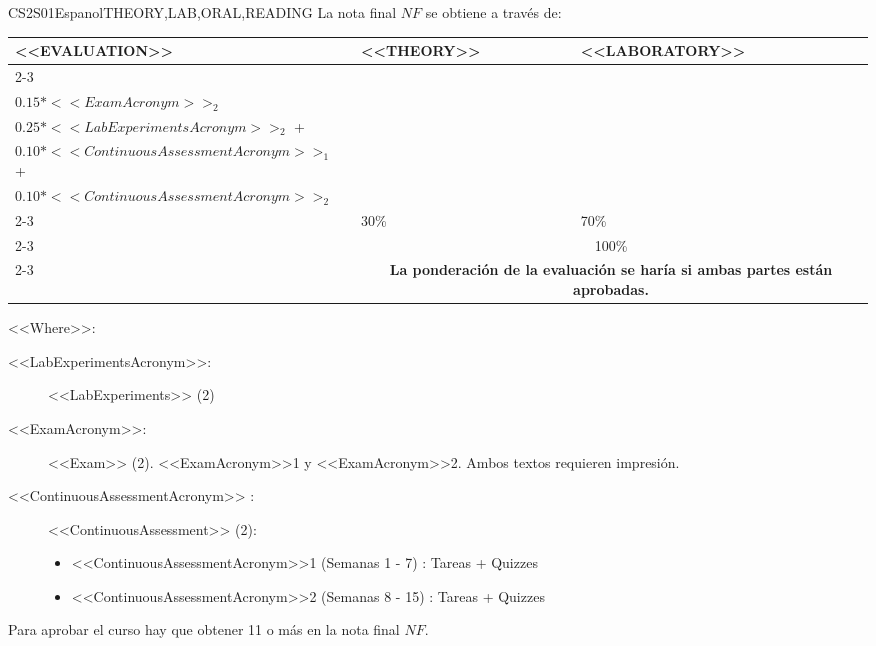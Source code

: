   \begin{evaluation}{CS2S01}{Espanol}{THEORY,LAB,ORAL,READING}
  La nota final $NF$ se obtiene a través de:

  \begin{tabularx}{0.9\textwidth}{|X|p{}|p{}|} \hline
  \multirow{4}{*}{\uppercase{<<Evaluation>>}} & \uppercase{<<Theory>>} & \uppercase{<<Laboratory>>} \\ \cline{2-3}
  & %
      \begin{minipage}{0.95\textwidth}
      \begin{tabular}{l}
          $0.15*<<ExamAcronym>>_{1}$ + \\
          $0.15*<<ExamAcronym>>_{2}$
          \end{tabular} 
      \end{minipage} 
  & %
      \begin{minipage}{0.95\textwidth}
      \begin{tabular}{l}
          $0.25*<<LabExperimentsAcronym>>_{1}$ + \\
          $0.25*<<LabExperimentsAcronym>>_{2}$ + \\
          $0.10*<<ContinuousAssessmentAcronym>>_{1}$ + \\
          $0.10*<<ContinuousAssessmentAcronym>>_{2}$
      \end{tabular} 
      \end{minipage}                 \\ \cline{2-3}
  & %
  30\% 
  & %
  70\% \\ \cline{2-3}
  & \multicolumn{2}{c|}{100\%}  \\ \cline{2-3}
  & \multicolumn{2}{c|}{\textbf{\textbf{La ponderación de la evaluación se haría si ambas partes están aprobadas.}}}  \\ \hline
  \end{tabularx}
      
  \vspace{2mm}
  \noindent <<Where>>:
  \begin{description}
    \item[<<LabExperimentsAcronym>>:] <<LabExperiments>> (2)
    \item[<<ExamAcronym>>:] <<Exam>> (2). <<ExamAcronym>>1 y <<ExamAcronym>>2. Ambos textos requieren impresión.
    \item[<<ContinuousAssessmentAcronym>> :] <<ContinuousAssessment>> (2):
      \begin{itemize}
        \item  <<ContinuousAssessmentAcronym>>1 (Semanas 1 - 7) :  Tareas +   Quizzes
        \item <<ContinuousAssessmentAcronym>>2 (Semanas 8 - 15) : Tareas +  Quizzes
      \end{itemize}
  \end{description}
 
  \noindent Para aprobar el curso hay que obtener 11 o más en la nota final $NF$.
  \end{evaluation}
 
